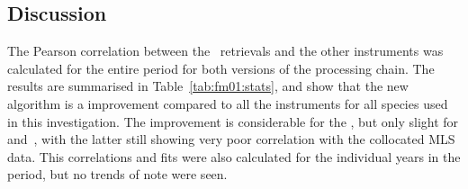 
\subsubsection{}
\label{sec:fm01:comparison:temperature}


\subsection{Discussion}
\label{sec:fm01:discussion}
The Pearson correlation between the \smr\ retrievals and the other instruments
was calculated for the entire period for both versions of the processing chain.
The results are summarised in Table~\ref{tab:fm01:stats}, and show that the
new algorithm is a improvement compared to all the instruments for all species
used in this investigation. The improvement is considerable for the ,
but only slight for  and~, with the latter still showing
very poor correlation with the collocated MLS data. This correlations and fits
were also calculated for the individual years in the period, but no trends of
note were seen.


